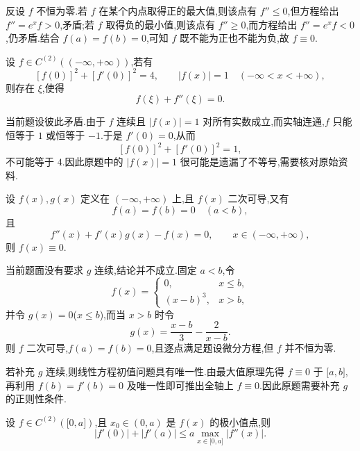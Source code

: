 \begin{solution}
    反设 $f$ 不恒为零.若 $f$ 在某个内点取得正的最大值,则该点有 $f''\leq0$,但方程给出 $f''=e^x f>0$,矛盾;若 $f$ 取得负的最小值,则该点有 $f''\geq0$,而方程给出 $f''=e^x f<0$,仍矛盾.结合 $f(a)=f(b)=0$,可知 $f$ 既不能为正也不能为负,故 $f\equiv0$.
\end{solution}

\begin{example}
    设 $f\in C^{(2)}((-\infty,+\infty))$,若有
    \[
        [f(0)]^2+[f'(0)]^2=4,
        \qquad |f(x)|=1\quad(-\infty<x<+\infty),
    \]
    则存在 $\xi$,使得
    \[
        f(\xi)+f''(\xi)=0.
    \]
\end{example}
\exampleblank

\begin{solution}
    当前题设彼此矛盾.由于 $f$ 连续且 $|f(x)|=1$ 对所有实数成立,而实轴连通,$f$ 只能恒等于 $1$ 或恒等于 $-1$.于是 $f'(0)=0$,从而
    \[
        [f(0)]^2+[f'(0)]^2=1,
    \]
    不可能等于 $4$.因此原题中的 $|f(x)|=1$ 很可能是遗漏了不等号,需要核对原始资料.
\end{solution}

\begin{example}
    设 $f(x),g(x)$ 定义在 $(-\infty,+\infty)$ 上,且 $f(x)$ 二次可导,又有
    \[
        f(a)=f(b)=0\quad(a<b),
    \]
    且
    \[
        f''(x)+f'(x)g(x)-f(x)=0,
        \qquad x\in(-\infty,+\infty),
    \]
    则 $f(x)\equiv0$.
\end{example}
\exampleblank

\begin{solution}
    当前题面没有要求 $g$ 连续,结论并不成立.固定 $a<b$,令
    \[
        f(x)=
        \begin{cases}
            0,       & x\leq b, \\
            (x-b)^3, & x>b,
        \end{cases}
    \]
    并令 $g(x)=0$($x\leq b$),而当 $x>b$ 时令
    \[
        g(x)=\dfrac{x-b}{3}-\dfrac{2}{x-b}.
    \]
    则 $f$ 二次可导,$f(a)=f(b)=0$,且逐点满足题设微分方程,但 $f$ 并不恒为零.

    若补充 $g$ 连续,则线性方程初值问题具有唯一性.由最大值原理先得 $f\equiv0$ 于 $\lbrack a,b\rbrack$,再利用 $f(b)=f'(b)=0$ 及唯一性即可推出全轴上 $f\equiv0$.因此原题需要补充 $g$ 的正则性条件.
\end{solution}

\begin{example}
    设 $f\in C^{(2)}(\lbrack 0,a\rbrack)$,且 $x_0\in(0,a)$ 是 $f(x)$ 的极小值点,则
    \[
        |f'(0)|+|f'(a)|
        \leq a\max\limits_{x\in\lbrack 0,a\rbrack}|f''(x)|.
    \]
\end{example}
\exampleblank

